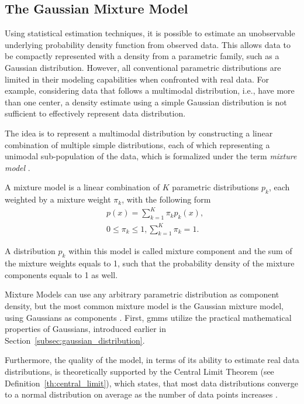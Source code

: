 \documentclass[../../../main.tex]{subfiles}
\begin{document}
\subsection{The Gaussian Mixture Model} \label{subsec:gaussian_mixture_model}

Using statistical estimation techniques, it is possible to estimate an unobservable underlying probability density function from observed data. This allows data to be compactly represented with a density from a parametric family, such as a Gaussian distribution. However, all conventional parametric distributions are limited in their modeling capabilities when confronted with real data. For example, considering data that follows a multimodal distribution, i.e., have more than one center, a density estimate using a simple Gaussian distribution is not sufficient to effectively represent data distribution.

The idea is to represent a multimodal distribution by constructing a linear combination of multiple simple distributions, each of which representing a unimodal sub-population of the data, which is formalized under the term \textit{mixture model} \cite[p.111]{bis_2006}.

\begin{definition} \cite[p. 315]{dei_2020}\label{th:mixture_model}
A mixture model is a linear combination of $K$ parametric distributions $p_k$, each weighted by a mixture weight $\pi_k$, with the following form 
\begin{align*}
    &p(x) = \sum\limits_{k=1}^K \pi_k p_k (x), \\
    &0 \leq \pi_k \leq 1, \sum\limits_{k=1}^K \pi_k = 1.
\end{align*}
\end{definition}

A distribution $p_k$ within this model is called mixture component and the sum of the mixture weights equals to 1, such that the probability density of the mixture components equals to 1 as well. 

Mixture Models can use any arbitrary parametric distribution as component density, but the most common mixture model is the Gaussian mixture model, using Gaussians as components \cite[214]{has_2009}. First, \acrshort{gmm}s utilize the practical mathematical properties of Gaussians, introduced earlier in Section~\ref{subsec:gaussian_distribution}. 

Furthermore, the quality of the model, in terms of its ability to estimate real data distributions, is theoretically supported by the Central Limit Theorem (see Definition~\ref{th:central_limit}), which states, that most data distributions converge to a normal distribution on average as the number of data points increases \cite[p.222]{jay_2003}.
\end{document}
